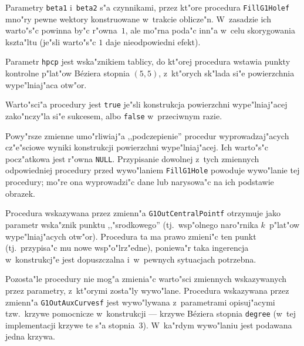 Parametry \texttt{beta1} i~\texttt{beta2} s"a czynnikami, przez kt"ore
procedura \texttt{FillG1Holef} mno"ry pewne wektory konstruowane w~trakcie
oblicze"n. W~zasadzie ich warto"s"c powinna by"c r"owna~$1$, ale mo"rna
poda"c inn"a w~celu skorygowania kszta"ltu (je"sli warto"s"c $1$ daje
nieodpowiedni efekt).

Parametr \texttt{hpcp} jest wska"znikiem tablicy, do kt"orej procedura
wstawia punkty kontrolne p"lat"ow B\'{e}ziera stopnia $(5,5)$, z~kt"orych
sk"lada si"e powierzchnia wype"lniaj"aca otw"or.

Warto"sci"a procedury jest \texttt{true} je"sli konstrukcja powierzchni
wype"lniaj"acej zako"nczy"la si"e sukcesem, albo \texttt{false} w~przeciwnym
razie.

\vspace{\bigskipamount}
\begin{sloppypar}
Powy"rsze zmienne umo"rliwiaj"a ,,podczepienie'' procedur wyprowadzaj"acych
cz"e"s\-cio\-we wyniki konstrukcji powierzchni wype"lniaj"acej. Ich warto"s"c
pocz"atkowa jest r"owna \texttt{NULL}. Przypisanie dowolnej z~tych zmiennych
odpowiedniej procedury przed wywo"laniem \texttt{FillG1Hole} powoduje
wywo"lanie tej procedury; mo"re ona wyprowadzi"c dane lub narysowa"c na ich
podstawie obrazek.
\end{sloppypar}

Procedura wskazywana przez zmienn"a \texttt{G1OutCentralPointf} otrzymuje
jako parametr wska"znik punktu ,,"srodkowego'' (tj.\ wsp"olnego naro"rnika
$k$~p"lat"ow wype"lniaj"acych otw"or). Procedura ta ma prawo zmieni"c ten
punkt (tj.\ przypisa"c mu nowe wsp"o"lrz"edne), poniewa"r taka ingerencja
w~konstrukcj"e jest dopuszczalna i~w~pewnych sytuacjach potrzebna.

Pozosta"le procedury nie mog"a zmienia"c warto"sci zmiennych wskazywanych
przez parametry, z~kt"orymi zosta"ly wywo"lane. Procedura wskazywana przez
zmienn"a \texttt{G1OutAuxCurvesf} jest wywo"lywana z~parametrami opisuj"acymi
tzw.\ krzywe pomocnicze w~konstrukcji --- krzywe B\'{e}ziera stopnia
\texttt{degree} (w~tej implementacji krzywe te s"a stopnia~$3$). W~ka"rdym
wywo"laniu jest podawana jedna krzywa.

